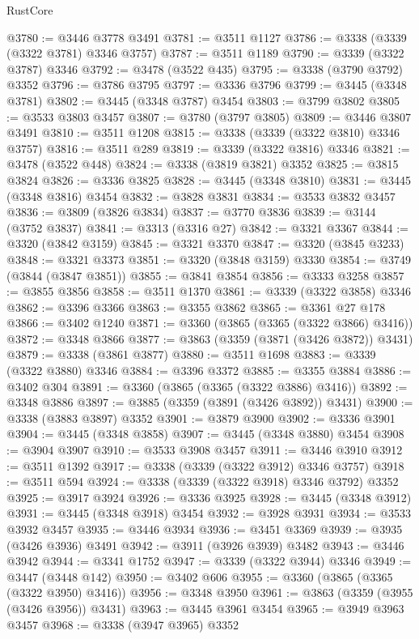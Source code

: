 \begin{lexlean}{RustCore}
\begin{coremodule}
@3780 := @3446 @3778 @3491
@3781 := @3511 @1127
@3786 := @3338 (@3339 (@3322 @3781) @3346 @3757)
@3787 := @3511 @1189
@3790 := @3339 (@3322 @3787) @3346
@3792 := @3478 (@3522 @435)
@3795 := @3338 (@3790 @3792) @3352
@3796 := @3786 @3795
@3797 := @3336 @3796
@3799 := @3445 (@3348 @3781)
@3802 := @3445 (@3348 @3787) @3454
@3803 := @3799 @3802
@3805 := @3533 @3803 @3457
@3807 := @3780 (@3797 @3805)
@3809 := @3446 @3807 @3491
@3810 := @3511 @1208
@3815 := @3338 (@3339 (@3322 @3810) @3346 @3757)
@3816 := @3511 @289
@3819 := @3339 (@3322 @3816) @3346
@3821 := @3478 (@3522 @448)
@3824 := @3338 (@3819 @3821) @3352
@3825 := @3815 @3824
@3826 := @3336 @3825
@3828 := @3445 (@3348 @3810)
@3831 := @3445 (@3348 @3816) @3454
@3832 := @3828 @3831
@3834 := @3533 @3832 @3457
@3836 := @3809 (@3826 @3834)
@3837 := @3770 @3836
@3839 := @3144 (@3752 @3837)
@3841 := @3313 (@3316 @27)
@3842 := @3321 @3367
@3844 := @3320 (@3842 @3159)
@3845 := @3321 @3370
@3847 := @3320 (@3845 @3233)
@3848 := @3321 @3373
@3851 := @3320 (@3848 @3159) @3330
@3854 := @3749 (@3844 (@3847 @3851))
@3855 := @3841 @3854
@3856 := @3333 @3258
@3857 := @3855 @3856
@3858 := @3511 @1370
@3861 := @3339 (@3322 @3858) @3346
@3862 := @3396 @3366
@3863 := @3355 @3862
@3865 := @3361 @27 @178
@3866 := @3402 @1240
@3871 := @3360 (@3865 (@3365 (@3322 @3866) @3416))
@3872 := @3348 @3866
@3877 := @3863 (@3359 (@3871 (@3426 @3872)) @3431)
@3879 := @3338 (@3861 @3877)
@3880 := @3511 @1698
@3883 := @3339 (@3322 @3880) @3346
@3884 := @3396 @3372
@3885 := @3355 @3884
@3886 := @3402 @304
@3891 := @3360 (@3865 (@3365 (@3322 @3886) @3416))
@3892 := @3348 @3886
@3897 := @3885 (@3359 (@3891 (@3426 @3892)) @3431)
@3900 := @3338 (@3883 @3897) @3352
@3901 := @3879 @3900
@3902 := @3336 @3901
@3904 := @3445 (@3348 @3858)
@3907 := @3445 (@3348 @3880) @3454
@3908 := @3904 @3907
@3910 := @3533 @3908 @3457
@3911 := @3446 @3910
@3912 := @3511 @1392
@3917 := @3338 (@3339 (@3322 @3912) @3346 @3757)
@3918 := @3511 @594
@3924 := @3338 (@3339 (@3322 @3918) @3346 @3792) @3352
@3925 := @3917 @3924
@3926 := @3336 @3925
@3928 := @3445 (@3348 @3912)
@3931 := @3445 (@3348 @3918) @3454
@3932 := @3928 @3931
@3934 := @3533 @3932 @3457
@3935 := @3446 @3934
@3936 := @3451 @3369
@3939 := @3935 (@3426 @3936) @3491
@3942 := @3911 (@3926 @3939) @3482
@3943 := @3446 @3942
@3944 := @3341 @1752
@3947 := @3339 (@3322 @3944) @3346
@3949 := @3447 (@3448 @142)
@3950 := @3402 @606
@3955 := @3360 (@3865 (@3365 (@3322 @3950) @3416))
@3956 := @3348 @3950
@3961 := @3863 (@3359 (@3955 (@3426 @3956)) @3431)
@3963 := @3445 @3961 @3454
@3965 := @3949 @3963 @3457
@3968 := @3338 (@3947 @3965) @3352

\end{coremodule}
\end{lexlean}
